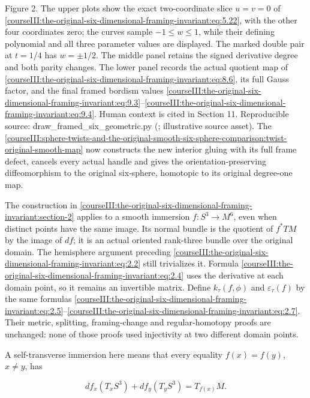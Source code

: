 Figure 2. The upper plots show the exact two-coordinate slice \(u=v=0\) of \eqref{courseIII:the-original-six-dimensional-framing-invariant:eq:5.22}, with the other four coordinates zero; the curves sample \(-1\le w\le1\), while their defining polynomial and all three parameter values are displayed. The marked double pair at \(t=1/4\) has \(w=\pm1/2\). The middle panel retains the signed derivative degree and both parity changes. The lower panel records the actual quotient map of \eqref{courseIII:the-original-six-dimensional-framing-invariant:eq:8.6}, its full Gauss factor, and the final framed bordism values \eqref{courseIII:the-original-six-dimensional-framing-invariant:eq:9.3}--\eqref{courseIII:the-original-six-dimensional-framing-invariant:eq:9.4}. Human context is cited in Section 11. Reproducible source: draw\_framed\_six\_geometric.py (; illustrative source asset). The \cref{courseIII:sphere-twists-and-the-original-smooth-six-sphere-comparison:twist-original-smooth-map} now constructs the new interior gluing with its full frame defect, cancels every actual handle and gives the orientation-preserving diffeomorphism to the original six-sphere, homotopic to its original degree-one map.

The construction in \cref{courseIII:the-original-six-dimensional-framing-invariant:section-2} applies to a smooth immersion \(f:S^3\to M^6\), even when distinct points have the same image. Its normal bundle is the quotient of \(f^*TM\) by the image of \(df\); it is an actual oriented rank-three bundle over the original domain. The hemisphere argument preceding \eqref{courseIII:the-original-six-dimensional-framing-invariant:eq:2.2} still trivializes it. Formula \eqref{courseIII:the-original-six-dimensional-framing-invariant:eq:2.4} uses the derivative at each domain point, so it remains an invertible matrix. Define \(k_\tau(f,\phi)\) and \(\varepsilon_\tau(f)\) by the same formulas \eqref{courseIII:the-original-six-dimensional-framing-invariant:eq:2.5}--\eqref{courseIII:the-original-six-dimensional-framing-invariant:eq:2.7}. Their metric, splitting, framing-change and regular-homotopy proofs are unchanged: none of those proofs used injectivity at two different domain points.

A self-transverse immersion here means that every equality \(f(x)=f(y)\), \(x\ne y\), has

\begin{equation}
df_x(T_xS^3)+df_y(T_yS^3)=T_{f(x)}M.
 \label{courseIII:the-original-six-dimensional-framing-invariant:eq:5.1}
\end{equation}

